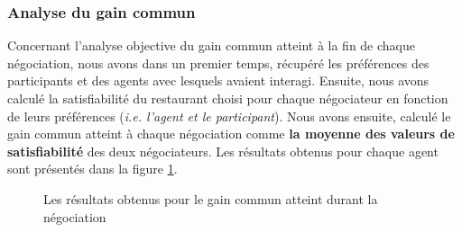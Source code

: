 	\subsubsection{Analyse du gain commun } Concernant l'analyse objective du gain commun atteint à la fin de chaque négociation, nous avons dans un premier temps, récupéré les préférences des participants et des agents avec lesquels avaient interagi. 
	Ensuite, nous avons calculé la satisfiabilité du restaurant choisi pour chaque négociateur en fonction de leurs préférences (\textit{i.e. l'agent et le participant}). Nous avons ensuite, calculé le gain commun atteint à chaque négociation comme \textbf{la moyenne des valeurs de satisfiabilité} des deux négociateurs.  Les résultats obtenus pour chaque agent sont présentés dans la figure \ref{fig:gain}. 
	
		\begin{figure}[h]
		
		
		\caption{Les résultats obtenus pour le gain commun atteint durant la négociation}
		\label{fig:gain}
	\end{figure}

